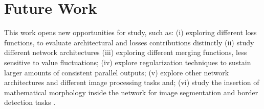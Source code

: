 \section{Future Work}
\label{cap7_trab_futuro}

This work opens new opportunities for study, such as: (i) exploring different loss functions, to evaluate architectural and losses contributions distinctly (ii) study different network architectures (iii) exploring different merging functions, less sensitive to value fluctuations; (iv) explore regularization techniques to sustain larger amounts of consistent parallel outputs; (v) explore other network architectures and different image processing tasks and; (vi) study the insertion of mathematical morphology inside the network for image segmentation and border detection tasks \cite{Reis:2019}.
